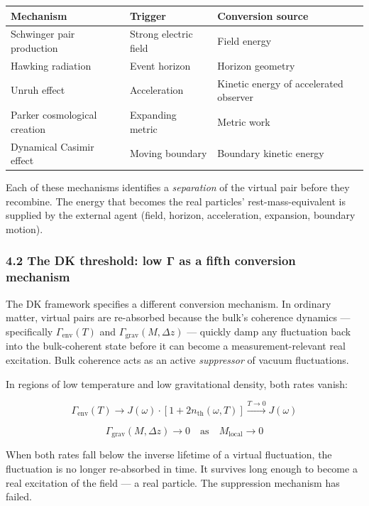 \documentclass[
]{article}
\newcounter{none} %
\begin{document}
{\def\LTcaptype{none} %
\begin{longtable}[]{@{}lll@{}}
\toprule\noalign{}
Mechanism & Trigger & Conversion source \\
\midrule\noalign{}
\endhead
\bottomrule\noalign{}
\endlastfoot
Schwinger pair production & Strong electric field & Field energy \\
Hawking radiation & Event horizon & Horizon geometry \\
Unruh effect & Acceleration & Kinetic energy of accelerated observer \\
Parker cosmological creation & Expanding metric & Metric work \\
Dynamical Casimir effect & Moving boundary & Boundary kinetic energy \\
\end{longtable}
}

Each of these mechanisms identifies a \emph{separation} of the virtual
pair before they recombine. The energy that becomes the real particles'
rest-mass-equivalent is supplied by the external agent (field, horizon,
acceleration, expansion, boundary motion).

\subsubsection{4.2 The DK threshold: low Γ as a fifth conversion
mechanism}\label{the-dk-threshold-low-ux3b3-as-a-fifth-conversion-mechanism}

The DK framework specifies a different conversion mechanism. In ordinary
matter, virtual pairs are re-absorbed because the bulk's coherence
dynamics --- specifically \(\Gamma_{\text{env}}(T)\) and
\(\Gamma_{\text{grav}}(M, \Delta z)\) --- quickly damp any fluctuation
back into the bulk-coherent state before it can become a
measurement-relevant real excitation. Bulk coherence acts as an active
\emph{suppressor} of vacuum fluctuations.

In regions of low temperature and low gravitational density, both rates
vanish:

\[\Gamma_{\text{env}}(T) \to J(\omega) \cdot [1 + 2 n_{\text{th}}(\omega, T)] \xrightarrow{T \to 0} J(\omega)\]

\[\Gamma_{\text{grav}}(M, \Delta z) \to 0 \quad \text{as} \quad M_{\text{local}} \to 0\]

When both rates fall below the inverse lifetime of a virtual
fluctuation, the fluctuation is no longer re-absorbed in time. It
survives long enough to become a real excitation of the field --- a real
particle. The suppression mechanism has failed.
\end{document}
